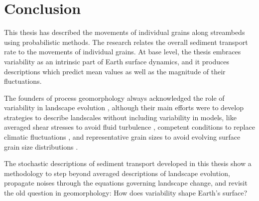\section{Conclusion}

This thesis has described the movements of individual grains along streambeds using probabilistic methods.
The research relates the overall sediment transport rate to the movements of individual grains.
At base level, the thesis embraces variability as an intrinsic part of Earth surface dynamics, and it produces descriptions which predict mean values as well as the magnitude of their fluctuations.

The founders of process geomorphology always acknowledged the role of variability in landscape evolution \citep{Horton1945,Strahler1952,Langbein1964}, although their main efforts were to develop strategies to describe landscales without including variability in models, like averaged shear stresses to avoid fluid turbulence \citep{MeyerPeter1948,Bagnold1954}, competent conditions to replace climatic fluctuations \citep{Wolman1959,Wolman1978}, and representative grain sizes to avoid evolving surface grain size distributions \citep{Parker1982,Andrews1983}.

The stochastic descriptions of sediment transport developed in this thesis show a methodology to step beyond averaged descriptions of landscape evolution, propagate noises through the equations governing landscape change, and revisit the old question in geomorphology: How does variability shape Earth's surface?

